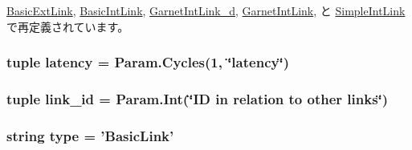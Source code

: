 \hyperlink{classBasicLink_1_1BasicExtLink_a17da7064bc5c518791f0c891eff05fda}{BasicExtLink}, \hyperlink{classBasicLink_1_1BasicIntLink_a17da7064bc5c518791f0c891eff05fda}{BasicIntLink}, \hyperlink{classGarnetLink__d_1_1GarnetIntLink__d_a17da7064bc5c518791f0c891eff05fda}{GarnetIntLink\_\-d}, \hyperlink{classGarnetLink_1_1GarnetIntLink_a17da7064bc5c518791f0c891eff05fda}{GarnetIntLink}, と \hyperlink{classSimpleLink_1_1SimpleIntLink_a17da7064bc5c518791f0c891eff05fda}{SimpleIntLink}で再定義されています。\hypertarget{classBasicLink_1_1BasicLink_ab6371bb71615c96debd0d27d34943fed}{
\subsubsection[{latency}]{\setlength{\rightskip}{0pt plus 5cm}tuple {\bf latency} = Param.Cycles(1, \char`\"{}latency\char`\"{})}}
\label{classBasicLink_1_1BasicLink_ab6371bb71615c96debd0d27d34943fed}
\hypertarget{classBasicLink_1_1BasicLink_a68ad93ab49e865b9e80829c3ee7130c7}{
\subsubsection[{link\_\-id}]{\setlength{\rightskip}{0pt plus 5cm}tuple {\bf link\_\-id} = Param.Int(\char`\"{}ID in relation to other links\char`\"{})}}
\label{classBasicLink_1_1BasicLink_a68ad93ab49e865b9e80829c3ee7130c7}
\hypertarget{classBasicLink_1_1BasicLink_acce15679d830831b0bbe8ebc2a60b2ca}{
\subsubsection[{type}]{\setlength{\rightskip}{0pt plus 5cm}string {\bf type} = '{\bf BasicLink}'}}
\label{classBasicLink_1_1BasicLink_acce15679d830831b0bbe8ebc2a60b2ca}


